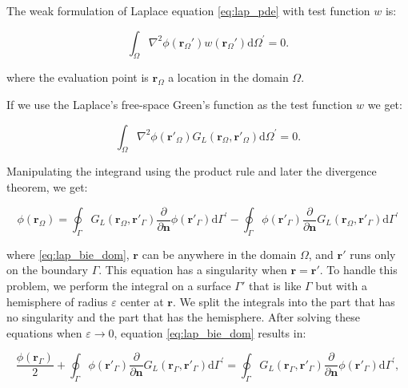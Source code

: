 The weak formulation of Laplace equation \eqref{eq:lap_pde} with test function $w$ is:

\begin{equation} \label{eq:lap_weak}
\int_\Omega \nabla^2 \phi(\mathbf{r}_\Omega') w(\mathbf{r}_\Omega') \text{d} \Omega^\prime= 0.
\end{equation}

where the evaluation point is $\mathbf{r}_\Omega$ a location in the domain $\Omega$.

If we use the Laplace's free-space Green's function as the test function $w$ we
get:

\begin{equation} \label{eq:lap_weak2}
\int_\Omega \nabla^2 \phi(\mathbf{r}'_\Omega) G_L(\mathbf{r}_\Omega,\mathbf{r}'_\Omega) \text{d} \Omega^\prime= 0.
\end{equation}

Manipulating the integrand using the product rule and later the divergence 
theorem, we get:

\begin{equation} \label{eq:lap_bie_dom}
\phi(\mathbf{r}_\Omega) = \oint_\Gamma G_L(\mathbf{r}_\Omega,\mathbf{r}'_\Gamma)  \frac{\partial} {\partial \mathbf{n}} \phi(\mathbf{r}'_\Gamma)  \text{d} \Gamma^\prime - \oint_\Gamma \phi(\mathbf{r}'_\Gamma)  \frac{\partial}{\partial \mathbf{n}} G_L(\mathbf{r}_\Omega,\mathbf{r}'_\Gamma) \text{d} \Gamma^\prime
\end{equation}

where \eqref{eq:lap_bie_dom}, $\mathbf{r}$ can be anywhere in the domain $\Omega$, 
and $\mathbf{r}'$ runs only on the boundary $\Gamma$. This equation has a 
singularity when $\mathbf{r}=\mathbf{r}'$. To handle this problem, we perform the
integral on a surface $\Gamma'$ that is like $\Gamma$ but with a hemisphere of 
radius $\varepsilon$ center at $\mathbf{r}$. We split the integrals into the part
that has no singularity and the part that has the hemisphere. After solving these
equations when $\varepsilon \to 0$, equation \eqref{eq:lap_bie_dom} results in:

\begin{equation} \label{eq:lap_bie}
\frac{\phi(\mathbf{r}_\Gamma)}{2} +  \oint_\Gamma \phi(\mathbf{r}'_\Gamma)  \frac{\partial}{\partial \mathbf{n}} G_L(\mathbf{r}_\Gamma,\mathbf{r}'_\Gamma) \text{d} \Gamma^\prime = \oint_\Gamma G_L(\mathbf{r}_\Gamma,\mathbf{r}'_\Gamma)  \frac{\partial} {\partial \mathbf{n}} \phi(\mathbf{r}'_\Gamma)  \text{d} \Gamma^\prime,
\end{equation}


